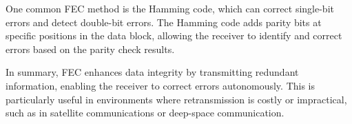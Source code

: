 One common FEC method is the Hamming code, which can correct single-bit errors and detect double-bit errors. The Hamming code adds parity bits at specific positions in the data block, allowing the receiver to identify and correct errors based on the parity check results.

In summary, FEC enhances data integrity by transmitting redundant information, enabling the receiver to correct errors autonomously. This is particularly useful in environments where retransmission is costly or impractical, such as in satellite communications or deep-space communication.

